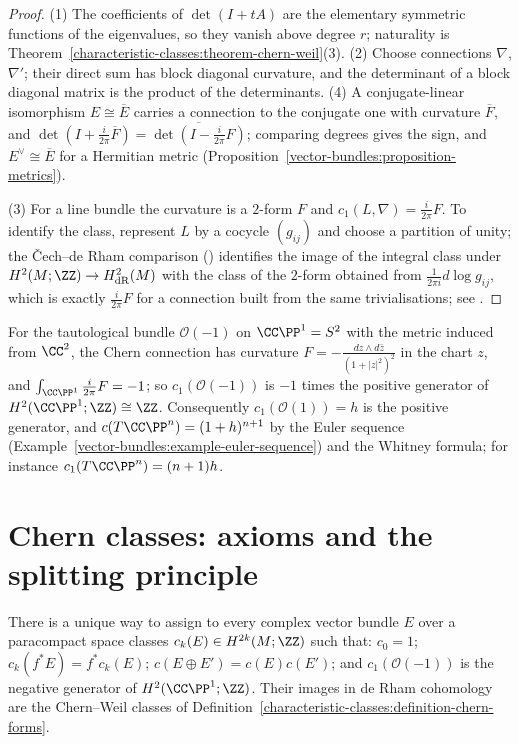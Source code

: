 \begin{proof}
(1) The coefficients of $\det(I + tA)$ are the elementary symmetric functions of the eigenvalues, so they vanish above degree $r$; naturality is
Theorem~\ref{characteristic-classes:theorem-chern-weil}(3). (2) Choose connections $\nabla$, $\nabla'$; their direct sum has block diagonal curvature, and the determinant of a block diagonal matrix is the
product of the determinants. (4) A conjugate-linear isomorphism $E \cong \overline{E}$ carries a connection to the conjugate one with curvature $\overline{F}$, and
$\det(I + \frac{i}{2\pi}\overline{F}) = \overline{\det(I - \frac{i}{2\pi}F)}$; comparing degrees gives the sign, and $E^\vee \cong \overline{E}$ for a Hermitian metric
(Proposition~\ref{vector-bundles:proposition-metrics}).

(3) For a line bundle the curvature is a $2$-form $F$ and $c_1(L, \nabla) = \frac{i}{2\pi}F$. To identify the class, represent $L$ by a cocycle $(g_{ij})$ and choose a partition of unity; the \v{C}ech--de Rham
comparison (\cite[Chapter II]{bott-tu}) identifies the image of the integral class under $H^2(M; \ZZ) \to H^2_{\mathrm{dR}}(M)$ with the class of the $2$-form obtained from
$\frac{1}{2\pi i}d\log g_{ij}$, which is exactly $\frac{i}{2\pi}F$ for a connection built from the same trivialisations; see \cite[Chapter 1]{griffiths-harris}.
\end{proof}

\begin{example}\label{characteristic-classes:example-tautological}
For the tautological bundle $\mathcal{O}(-1)$ on $\CC\PP^1 = S^2$ with the metric induced from $\CC^2$, the Chern connection has curvature $F = -\frac{dz \wedge d\bar z}{(1 + |z|^2)^2}$ in the chart
$z$, and $\int_{\CC\PP^1}\frac{i}{2\pi}F = -1$; so $c_1(\mathcal{O}(-1))$ is $-1$ times the positive generator of $H^2(\CC\PP^1; \ZZ) \cong \ZZ$. Consequently $c_1(\mathcal{O}(1)) = h$ is the positive
generator, and $c(T\CC\PP^n) = (1 + h)^{n+1}$ by the Euler sequence (Example~\ref{vector-bundles:example-euler-sequence}) and the Whitney formula; for instance $c_1(T\CC\PP^n) = (n+1)h$.
\end{example}

\section{Chern classes: axioms and the splitting principle}\label{characteristic-classes:section-axioms}

\begin{theorem}\label{characteristic-classes:theorem-chern-axioms}
There is a unique way to assign to every complex vector bundle $E$ over a paracompact space classes $c_k(E) \in H^{2k}(M; \ZZ)$ such that: $c_0 = 1$; $c_k(f^*E) = f^*c_k(E)$; $c(E \oplus E') = c(E)c(E')$;
and $c_1(\mathcal{O}(-1))$ is the negative generator of $H^2(\CC\PP^1; \ZZ)$. Their images in de Rham cohomology are the Chern--Weil classes of
Definition~\ref{characteristic-classes:definition-chern-forms}.
\end{theorem}

